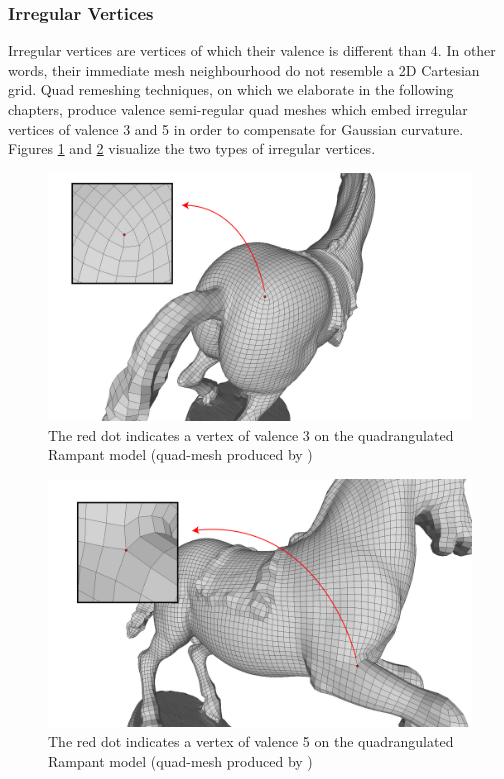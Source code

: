\subsubsection{Irregular Vertices}
Irregular vertices are vertices of which their valence is different than 4. In other words, their immediate mesh neighbourhood do not resemble a 2D Cartesian grid. Quad remeshing techniques, on which we elaborate in the following chapters, produce valence semi-regular quad meshes which embed irregular vertices of valence 3 and 5 in order to compensate for Gaussian curvature. Figures \ref{fig:valence_3} and \ref{fig:valence_5} visualize the two types of irregular vertices.
\begin{figure}[ht]
\centering
\includegraphics[width=13cm]{figures/valence_3.png}
\caption[Irregular vertex of valence 3]{The red dot indicates a vertex of valence 3 on the quadrangulated Rampant model (quad-mesh produced by \cite{10.1111:cgf.13498})}
\label{fig:valence_3}
\end{figure}
\begin{figure}[ht]
\centering
\includegraphics[width=13cm]{figures/valence_5.png}
\caption[Irregular vertex of valence 5]{The red dot indicates a vertex of valence 5 on the quadrangulated Rampant model (quad-mesh produced by \cite{10.1111:cgf.13498})}
\label{fig:valence_5}
\end{figure}
